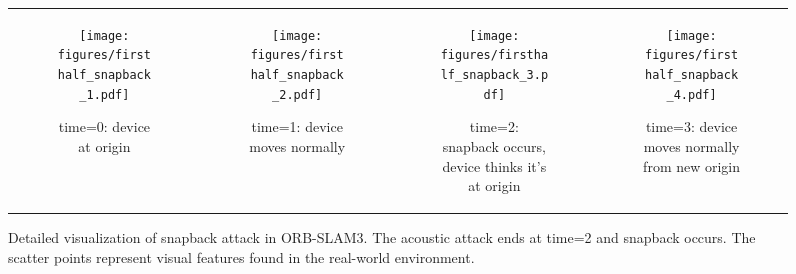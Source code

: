 \begin{figure*}[htb]
    \centering
    \begin{tabular}{cccc}
        \begin{subfigure}[t]{0.23\textwidth}
            \centering
            \texttt{[image: figures/firsthalf\_snapback\_1.pdf]}
            \caption{time=0: device at origin}
            \label{subfig:firsthalf_snapback_frame1}
        \end{subfigure} &
        \begin{subfigure}[t]{0.23\textwidth}
            \centering
            \texttt{[image: figures/firsthalf\_snapback\_2.pdf]}
            \caption{time=1: device moves normally}
            \label{subfig:firsthalf_snapback_frame2}
        \end{subfigure} &
        \begin{subfigure}[t]{0.23\textwidth}
            \centering
            \texttt{[image: figures/firsthalf\_snapback\_3.pdf]}
            \caption{time=2: snapback occurs, device thinks it's at origin}
            \label{subfig:firsthalf_snapback_frame3}
        \end{subfigure} &
        \begin{subfigure}[t]{0.23\textwidth}
            \centering
            \texttt{[image: figures/firsthalf\_snapback\_4.pdf]}
            \caption{time=3: device moves normally from new origin}
            \label{subfig:firsthalf_snapback_frame4}
        \end{subfigure} 
    \end{tabular}
    \caption{Detailed visualization of snapback attack in ORB-SLAM3. The acoustic attack ends at time=2 and snapback occurs. The scatter points represent visual features found in the real-world environment.
    }
    \label{fig:orbslam_snapback}
\end{figure*}

